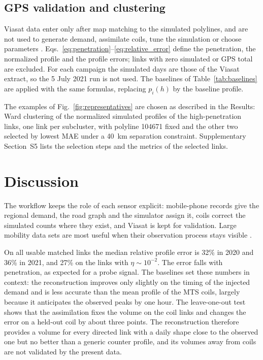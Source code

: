 \documentclass[pdflatex,Numbered]{sn-jnl}
\begin{document}
\subsection{GPS validation and clustering}

Viasat data enter only after map matching to the simulated polylines, and are not used to generate demand, assimilate coils, tune the simulation or choose parameters \cite{seo2015,seo2017,bellisardi2025}. Eqs.~\eqref{eq:penetration}--\eqref{eq:relative_error} define the penetration, the normalized profile and the profile errors; links with zero simulated or GPS total are excluded. For each campaign the simulated days are those of the Viasat extract, so the 5 July 2021 run is not used. The baselines of Table~\ref{tab:baselines} are applied with the same formulas, replacing $p_i(h)$ by the baseline profile.

The examples of Fig.~\ref{fig:representatives} are chosen as described in the Results: Ward clustering of the normalized simulated profiles of the high-penetration links, one link per subcluster, with polyline 104671 fixed and the other two selected by lowest MAE under a 40~km separation constraint. Supplementary Section~S5 lists the selection steps and the metrics of the selected links.

\section{Discussion}

The workflow keeps the role of each sensor explicit: mobile-phone records give the regional demand, the road graph and the simulator assign it, coils correct the simulated counts where they exist, and Viasat is kept for validation. Large mobility data sets are most useful when their observation process stays visible \cite{zheng2014,kitchin2014,kitchin2016,kandt2021}.

On all usable matched links the median relative profile error is 32\% in 2020 and 36\% in 2021, and 27\% on the links with $\eta\sim10^{-2}$. The error falls with penetration, as expected for a probe signal. The baselines set these numbers in context: the reconstruction improves only slightly on the timing of the injected demand and is less accurate than the mean profile of the MTS coils, largely because it anticipates the observed peaks by one hour. The leave-one-out test shows that the assimilation fixes the volume on the coil links and changes the error on a held-out coil by about three points. The reconstruction therefore provides a volume for every directed link with a daily shape close to the observed one but no better than a generic counter profile, and its volumes away from coils are not validated by the present data.
\end{document}
